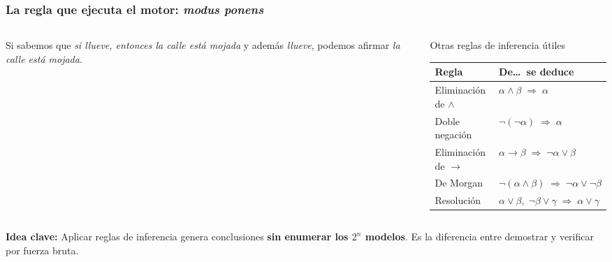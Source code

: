 \documentclass[aspectratio=169, 10pt]{beamer}
\newcommand{\idea}[1]{%
	\begin{tcolorbox}[colback=AccentGreen!6, colframe=AccentGreen, arc=3pt,
		width=\textwidth, boxsep=1pt, left=5pt, right=5pt, top=2pt, bottom=2pt,
		fontupper=\small]
		\RaggedRight\textbf{Idea clave:} #1
	\end{tcolorbox}
}
\begin{document}
\begin{frame}
\frametitle{La regla que ejecuta el motor: \emph{modus ponens}}
\begin{columns}[T]
\begin{column}{5.6cm}
\begin{center}
\end{center}
\vspace{0.4em}
\footnotesize
Si sabemos que \emph{si llueve, entonces la calle está mojada} y adem\'as \emph{llueve}, podemos afirmar \emph{la calle está mojada}.
\end{column}
\begin{column}{6.4cm}
\begin{block}{Otras reglas de inferencia útiles}
\footnotesize
\begin{tabular}{@{}ll@{}}
\toprule
\textbf{Regla} & \textbf{De\ldots\ se deduce} \\
\midrule
Eliminaci\'on de $\land$    & $\alpha \land \beta \;\Rightarrow\; \alpha$ \\
Doble negaci\'on            & $\neg(\neg\alpha) \;\Rightarrow\; \alpha$ \\
Eliminaci\'on de $\rightarrow$ & $\alpha \rightarrow \beta \;\Rightarrow\; \neg\alpha \lor \beta$ \\
De Morgan                   & $\neg(\alpha \land \beta) \;\Rightarrow\; \neg\alpha \lor \neg\beta$ \\
Resoluci\'on                & $\alpha\lor\beta,\;\neg\beta\lor\gamma \;\Rightarrow\; \alpha\lor\gamma$ \\
\bottomrule
\end{tabular}
\end{block}
\end{column}
\end{columns}
\vspace{0.2em}
\idea{Aplicar reglas de inferencia genera conclusiones \textbf{sin enumerar los $2^n$ modelos}. Es la diferencia entre demostrar y verificar por fuerza bruta.}
\end{frame}
\end{document}
